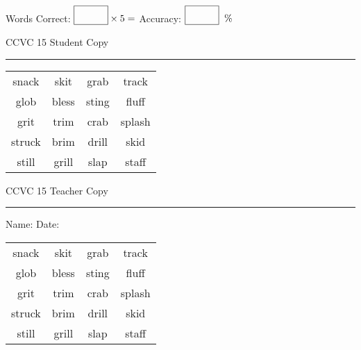 \documentclass{memoir}
\begin{document}
\small

Words Correct: $\fbox{\phantom{\huge 100}} \times 5 = $ Accuracy: $\fbox{\phantom{\huge 100}}\;\; \%$ 

\vfill

\newpage


\footnotesize \noindent
CCVC 15 \hfill Student Copy
\smallskip
\hrule

\Large

\setlength{\tabcolsep}{14pt}
\def\arraystretch{3}

{\selectfont


\begin{vplace}[0.5]
\begin{center}
\begin{tabular}{cccc}
snack & skit & grab                    & track       \\
glob & bless & sting & fluff \\
grit      & trim & crab        & splash \\
struck & brim      & drill & skid \\
still & grill            & slap            & staff            \\
\end{tabular}
\end{center}
\end{vplace}

}

\newpage

\footnotesize \noindent
CCVC 15 \hfill Teacher Copy
\smallskip
\hrule

\small

\vfill

\noindent
Name: \underline{\hspace{1.75in}} \hfill Date: \underline{\hspace{1in}}

\Large

{\selectfont


\begin{vplace}[0.5]
\begin{center}
\begin{tabular}{cccc}
snack & skit & grab                    & track       \\
glob & bless & sting & fluff \\
grit      & trim & crab        & splash \\
struck & brim      & drill & skid \\
still & grill            & slap            & staff            \\
\end{tabular}
\end{center}
\end{vplace}



}
\end{document}
